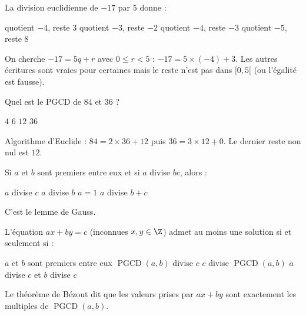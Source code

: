 
\begin{question}
La division euclidienne de $-17$ par $5$ donne :
\begin{reponses}
  \bonne quotient $-4$, reste $3$
  \mauvaise quotient $-3$, reste $-2$
  \mauvaise quotient $-4$, reste $-3$
  \mauvaise quotient $-5$, reste $8$
\end{reponses}
\begin{explication}
On cherche $-17=5q+r$ avec $0\le r<5$ : $-17=5\times(-4)+3$. Les autres écritures sont vraies pour certaines mais le reste n'est pas dans $[0,5[$ (ou l'égalité est fausse).
\end{explication}
\end{question}

\begin{question}
Quel est le PGCD de $84$ et $36$ ?
\begin{reponses}
  \mauvaise $4$
  \mauvaise $6$
  \bonne $12$
  \mauvaise $36$
\end{reponses}
\begin{explication}
Algorithme d'Euclide : $84=2\times36+12$ puis $36=3\times12+0$. Le dernier reste non nul est $12$.
\end{explication}
\end{question}

\begin{question}
Si $a$ et $b$ sont premiers entre eux et si $a$ divise $bc$, alors :
\begin{reponses}
  \bonne $a$ divise $c$
  \mauvaise $a$ divise $b$
  \mauvaise $a=1$
  \mauvaise $a$ divise $b+c$
\end{reponses}
\begin{explication}
C'est le lemme de Gauss.
\end{explication}
\end{question}

\begin{question}
L'équation $ax+by=c$ (inconnues $x,y\in\Z$) admet au moins une solution si et seulement si :
\begin{reponses}
  \mauvaise $a$ et $b$ sont premiers entre eux
  \bonne $\operatorname{PGCD}(a,b)$ divise $c$
  \mauvaise $c$ divise $\operatorname{PGCD}(a,b)$
  \mauvaise $a$ divise $c$ et $b$ divise $c$
\end{reponses}
\begin{explication}
Le théorème de Bézout dit que les valeurs prises par $ax+by$ sont exactement les multiples de $\operatorname{PGCD}(a,b)$.
\end{explication}
\end{question}

